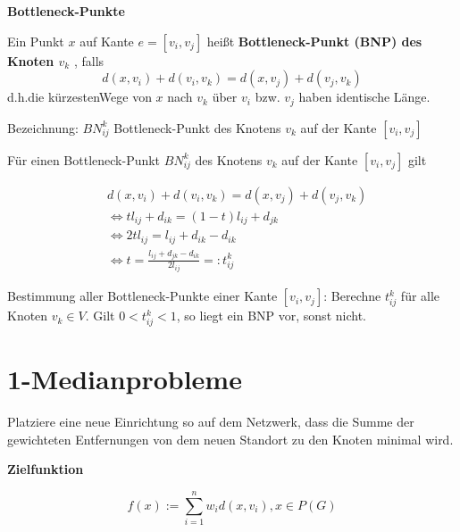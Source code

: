     \par \textbf{Bottleneck-Punkte}

    \par Ein Punkt $x$ auf Kante $e = [v_i, v_j]$ heißt \textbf{Bottleneck-Punkt (BNP) des Knoten $v_k$ }, falls
    \[
      d(x, v_i) + d(v_i, v_k) = d(x, v_j) + d(v_j, v_k)
    \]
    d.h.die kürzestenWege von $x$ nach $v_k$ über $v_i$ bzw. $v_j$ haben identische Länge.

    \par Bezeichnung: $BN_{ij}^k$ Bottleneck-Punkt des Knotens $v_k$ auf der Kante $[v_i, v_j]$

    \par Für einen Bottleneck-Punkt $BN_{ij}^k$ des Knotens $v_k$ auf der Kante $[v_i, v_j]$ gilt

    \begin{equation*}
      \begin{aligned}
        & d(x, v_i) + d(v_i, v_k) = d(x, v_j) + d(v_j, v_k) \\
        & \Leftrightarrow tl_{ij} + d_{ik} = (1-t)l_{ij} + d_{jk} \\
        & \Leftrightarrow 2tl_{ij} = l_{ij} + d_{ik} - d_{ik} \\
        & \Leftrightarrow t = \frac{l_{ij} + d_{jk} - d_{ik}}{2l_{ij}} =: t_{ij}^k    
        \end{aligned}
    \end{equation*}
      


    \par Bestimmung aller Bottleneck-Punkte einer Kante $[v_i, v_j]$:
    Berechne $t_{ij}^k$ für alle Knoten $v_k \in V$. Gilt $0 < t_{ij}^k < 1$, so liegt ein BNP vor, sonst nicht.


  \section{1-Medianprobleme} %
  \label{sec:1_medianprobleme}

    \par Platziere eine neue Einrichtung so auf dem Netzwerk, dass die Summe der gewichteten Entfernungen von dem neuen Standort zu den Knoten minimal wird.

    \par \textbf{Zielfunktion}

    \[
      f(x) := \sum_{i = 1}^{n}w_id(x, v_i), x \in P(G)
    \]

